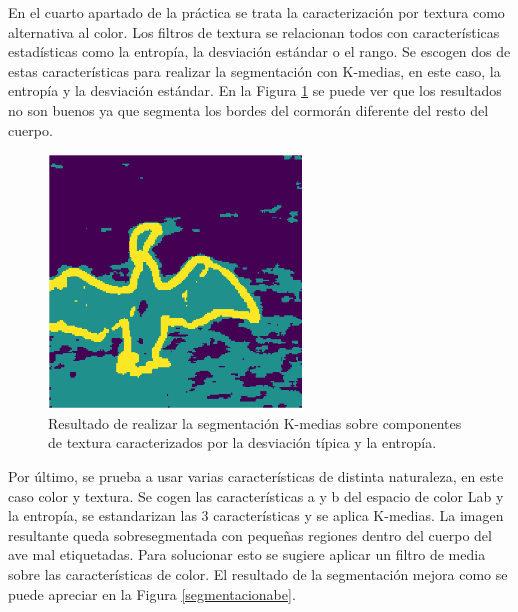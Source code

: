 En el cuarto apartado de la práctica se trata la caracterización por textura como alternativa al color. Los filtros de textura se relacionan todos con características estadísticas como la entropía, la desviación estándar o el rango. Se escogen dos de estas características para realizar la segmentación con K-medias, en este caso, la entropía y la desviación estándar. En la Figura \ref{segmentacionse} se puede ver que los resultados no son buenos ya que segmenta los bordes del cormorán diferente del resto del cuerpo.\\
\begin{figure}[h]
\centering
\includegraphics[width=0.6\textwidth]{imagenes/segmentacionse}
\caption{Resultado de realizar la segmentación K-medias sobre componentes de textura caracterizados por la desviación típica y la entropía.}
\label{segmentacionse}
\end{figure}

Por último, se prueba a usar varias características de distinta naturaleza, en este caso color y textura. Se cogen las características a y b del espacio de color Lab y la entropía, se estandarizan las 3 características y se aplica K-medias. La imagen resultante queda sobresegmentada con pequeñas regiones dentro del cuerpo del ave mal etiquetadas. Para solucionar esto se sugiere aplicar un filtro de media sobre las características de color. El resultado de la segmentación mejora como se puede apreciar en la Figura \ref{segmentacionabe}.\\ 


